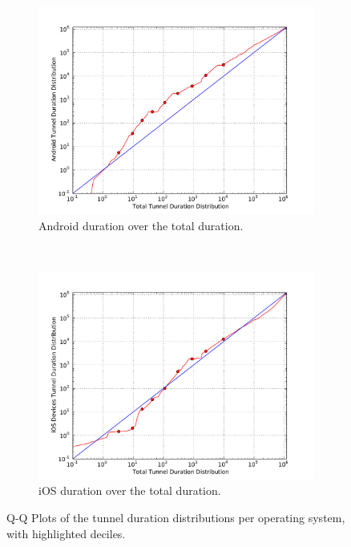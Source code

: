 \begin{figure}[htb]
        \begin{subfigure}[b]{0.50\textwidth}
            \centering
            \includegraphics[width=\textwidth]{images/qq-total-vs-android.pdf}
            \caption{Android duration over the total duration.}
            \label{c4:fig:qq-total-vs-android}
        \end{subfigure}%
        ~
        \begin{subfigure}[b]{0.50\textwidth}
            \centering
            \includegraphics[width=\textwidth]{images/qq-total-vs-ios.pdf}
            \caption{iOS duration over the total duration.}
            \label{c4:fig:qq-total-vs-ios}
        \end{subfigure}
 \caption{Q-Q Plots of the tunnel duration distributions per operating system, with highlighted deciles.}
\label{c4:fig:qq-plots}
\end{figure}


